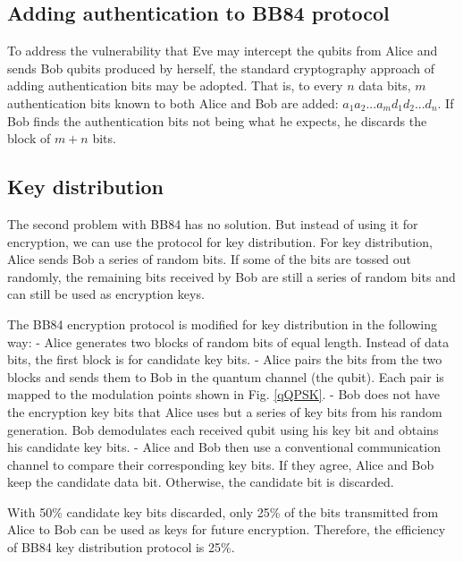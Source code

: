 \documentclass[oneside, letter, 12pt]{book}
\begin{document}
\subsection{Adding authentication to BB84 protocol}
To address the vulnerability that Eve may intercept the qubits from Alice and sends Bob qubits produced by herself, the standard cryptography approach of adding authentication bits may be adopted. That is, to every $n$ data bits, $m$ authentication bits known to both Alice and Bob are added: $a_1 a_2 ... a_m d_1 d_2 ...d_n$. If Bob finds the authentication bits not being what he expects, he discards the block of $m+n$ bits.

\subsection{Key distribution}
The second problem with BB84 has no solution. But instead of using it for encryption, we can use the protocol for key distribution. For key distribution, Alice sends Bob a series of random bits. If some of the bits are tossed out randomly, the remaining bits received by Bob are still a series of random bits and can still be used as encryption keys.

The BB84 encryption protocol is modified for key distribution in the following way:
- Alice generates two blocks of random bits of equal length. Instead of data bits, the first block is for candidate key bits.
- Alice pairs the bits from the two blocks and sends them to Bob in the quantum channel (the qubit). Each pair is mapped to the modulation points shown in Fig. \ref{qQPSK}.
- Bob does not have the encryption key bits that Alice uses but a series of key bits from his random generation. Bob demodulates each received qubit using his key bit and obtains his candidate key bits.
- Alice and Bob then use a conventional communication channel to compare their corresponding key bits. If they agree, Alice and Bob keep the candidate data bit. Otherwise, the candidate bit is discarded.

With 50\% candidate key bits discarded, only 25\% of the bits transmitted from Alice to Bob can be used as keys for future encryption. Therefore, the efficiency of BB84 key distribution protocol is 25\%.
\end{document}
